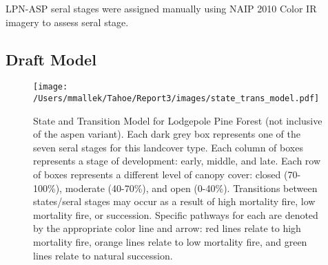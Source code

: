 LPN-ASP seral stages were assigned manually using NAIP 2010 Color IR imagery to assess seral stage.

\subsection*{Draft Model}
\begin{figure}[htbp]
\centering
\texttt{[image: /Users/mmallek/Tahoe/Report3/images/state\_trans\_model.pdf]}
\caption{State and Transition Model for Lodgepole Pine Forest (not inclusive of the aspen variant). Each dark grey box represents one of the seven seral stages for this landcover type. Each column of boxes represents a stage of development: early, middle, and late. Each row of boxes represents a different level of canopy cover: closed (70-100\%), moderate (40-70\%), and open (0-40\%). Transitions between states/seral stages may occur as a result of high mortality fire, low mortality fire, or succession. Specific pathways for each are denoted by the appropriate color line and arrow: red lines relate to high mortality fire, orange lines relate to low mortality fire, and green lines relate to natural succession.} 
\label{transmodel_lpn}
\end{figure}

\clearpage
